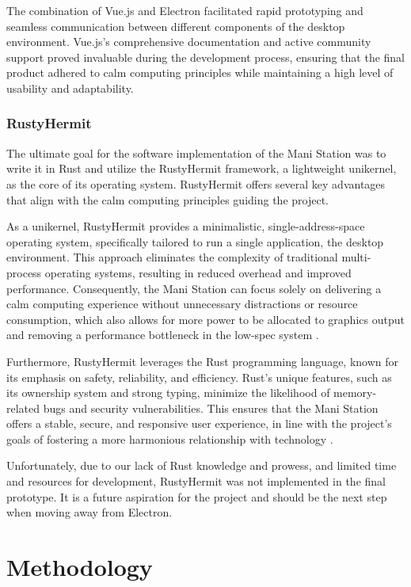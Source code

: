 \documentclass[letterpaper,twocolumn,10pt]{article}
\begin{document}
The combination of Vue.js and Electron facilitated rapid prototyping and seamless communication between different components of the desktop environment. Vue.js's comprehensive documentation and active community support proved invaluable during the development process, ensuring that the final product adhered to calm computing principles while maintaining a high level of usability and adaptability.

\subsubsection{RustyHermit}

The ultimate goal for the software implementation of the Mani Station was to write it in Rust and utilize the RustyHermit framework, a lightweight unikernel, as the core of its operating system. RustyHermit offers several key advantages that align with the calm computing principles guiding the project.

As a unikernel, RustyHermit provides a minimalistic, single-address-space operating system, specifically tailored to run a single application, the desktop environment. This approach eliminates the complexity of traditional multi-process operating systems, resulting in reduced overhead and improved performance. Consequently, the Mani Station can focus solely on delivering a calm computing experience without unnecessary distractions or resource consumption, which also allows for more power to be allocated to graphics output and removing a performance bottleneck in the low-spec system \cite{rust-performance}.

Furthermore, RustyHermit leverages the Rust programming language, known for its emphasis on safety, reliability, and efficiency. Rust's unique features, such as its ownership system and strong typing, minimize the likelihood of memory-related bugs and security vulnerabilities. This ensures that the Mani Station offers a stable, secure, and responsive user experience, in line with the project's goals of fostering a more harmonious relationship with technology \cite{rust}.

Unfortunately, due to our lack of Rust knowledge and prowess, and limited time and resources for development, RustyHermit was not implemented in the final prototype. It is a future aspiration for the project and should be the next step when moving away from Electron.

\section{Methodology}
\end{document}
